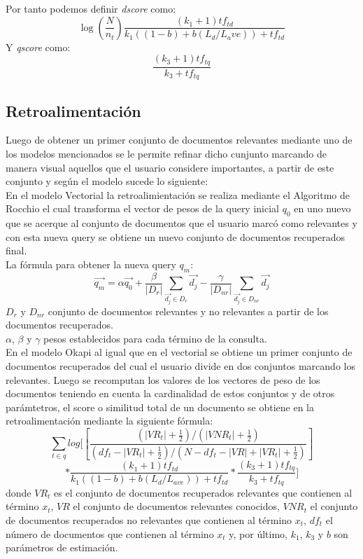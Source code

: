 \documentclass[a4paper,10pt,twocolumn]{article}
\begin{document}
    Por tanto podemos definir \textit{dscore} como:
    $$
        \log (\frac{N}{n_t}) \frac{(k_1 + 1)tf_{td}}{k_1((1-b) + b(L_d/L_ave)) + tf_{td}}
    $$
    Y \textit{qscore} como:
    $$
    \frac{(k_3 + 1) tf_{tq}}{ k_3 + tf_{tq} }
    $$


	\subsection{Retroalimentación}
		Luego de obtener un primer conjunto de documentos relevantes mediante uno de los modelos mencionados se le permite refinar dicho cunjunto marcando de 
		manera visual aquellos que el usuario considere importantes, a partir de este conjunto y según el modelo sucede lo siguiente:\\
		En el modelo Vectorial la retroalimientación se realiza mediante el Algoritmo de Rocchio el cual transforma el vector de pesos de la query inicial $q_0$ 
		en uno nuevo que se acerque al conjunto de documentos que el usuario marcó como relevantes y con esta nueva query se obtiene un nuevo conjunto de documentos 
		recuperados final.\\
		La fórmula para obtener la nueva query $q_m$:
		$$\vec{q_m} = \alpha \vec{q_0} + \frac{\beta}{|D_r|}\sum_{ \vec{d_j} \in D_r} \vec{d_j} - \frac{\gamma}{|D_{nr}|}\sum_{ \vec{d_j} \in D_{nr}} \vec{d_j}   $$
		$D_r$ y $D_{nr}$ conjunto de documentos relevantes y no relevantes a partir de los documentos recuperados.\\
		$\alpha$, $\beta$ y $\gamma$ pesos establecidos para cada término de la consulta.\\
		En el modelo Okapi al igual que en el vectorial se obtiene un primer conjunto de documentos recuperados del cual el usuario divide en dos conjuntos marcando 
		los relevantes. 
		Luego se recomputan los valores de los vectores de peso de los documentos teniendo en cuenta la cardinalidad de estos conjuntos y de otros parámtetros, 
		el score o similitud total de un documento se obtiene en la retroalimentación mediante la siguiente fórmula: \\
		$$\sum_{t \in q} log [[ \frac{(|VR_t| + \frac{1}{2}) / (|VNR_t| + \frac{1}{2})}{(df_t - |VR_t| + \frac{1}{2}) / (N - df_t - |VR| + |VR_t| + \frac{1}{2})}] $$
		$$* \frac{(k_1 + 1) tf_{td}}{k_1((1 - b) + b(L_d / L_{ave})) + tf_{td}} * \frac{(k_3 + 1) tf_{tq}}{k_3 + tf_{tq}}]$$
		donde $VR_t$ es el conjunto de documentos recuperados relevantes que contienen al término $x_t$,
		$VR$ el conjunto de documentos relevantes conocidos, $VNR_t$ el conjunto de documentos recuperados no relevantes que contienen al término $x_t$,
		$df_t$ el número de documentos que contienen al término $x_t$ y, por último, $k_1$, $k_3$ y $b$ son parámetros de estimación.
\end{document}
